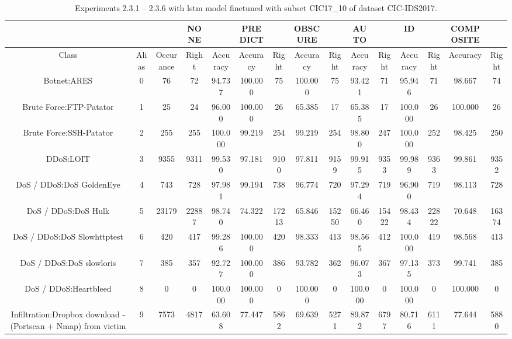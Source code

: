 \begin{table}[htb]
    \centering
    \caption{Experiments 2.3.1 – 2.3.6 with \gls{lstm} model finetuned with subset CIC17_10 of dataset CIC-IDS2017.}
    \label{table:results:lstm:flows_subset}
    \begin{tabular}{@{}ccccccccccccccc@{}}
        \toprule
         &  &  & NONE &  & PREDICT &  & OBSCURE &  & AUTO &  & ID &  & COMPOSITE &  \\
        \midrule
        Class &  Alias &  Occurance &  Right &  Accuracy &  Accuracy &  Right &  Accuracy &  Right &  Accuracy &  Right &  Accuracy &  Right &  Accuracy &  Right \\
        Botnet:ARES &  0 &  76 &  72 &  94.737 &  100.000 &  75 &  100.000 &  75 &  93.421 &  71 &  95.946 &  71 &  98.667 &  74 \\
        Brute Force:FTP-Patator &  1 &  25 &  24 &  96.000 &  100.000 &  26 &  65.385 &  17 &  65.385 &  17 &  100.000 &  26 &  100.000 &  26 \\
        Brute Force:SSH-Patator &  2 &  255 &  255 &  100.000 &  99.219 &  254 &  99.219 &  254 &  98.800 &  247 &  100.000 &  252 &  98.425 &  250 \\
        DDoS:LOIT &  3 &  9355 &  9311 &  99.530 &  97.181 &  9100 &  97.811 &  9159 &  99.915 &  9353 &  99.989 &  9363 &  99.861 &  9352 \\
        DoS / DDoS:DoS GoldenEye &  4 &  743 &  728 &  97.981 &  99.194 &  738 &  96.774 &  720 &  97.294 &  719 &  96.900 &  719 &  98.113 &  728 \\
        DoS / DDoS:DoS Hulk &  5 &  23179 &  22887 &  98.740 &  74.322 &  17213 &  65.846 &  15250 &  66.460 &  15422 &  98.434 &  22822 &  70.648 &  16374 \\
        DoS / DDoS:DoS Slowhttptest &  6 &  420 &  417 &  99.286 &  100.000 &  420 &  98.333 &  413 &  98.565 &  412 &  100.000 &  419 &  98.568 &  413 \\
        DoS / DDoS:DoS slowloris &  7 &  385 &  357 &  92.727 &  100.000 &  386 &  93.782 &  362 &  96.073 &  367 &  97.135 &  373 &  99.741 &  385 \\
        DoS / DDoS:Heartbleed &  8 &  0 &  0 &  100.000 &  100.000 &  0 &  100.000 &  0 &  100.000 &  0 &  100.000 &  0 &  100.000 &  0 \\
        Infiltration:Dropbox download - (Portscan + Nmap) from victim &  9 &  7573 &  4817 &  63.608 &  77.447 &  5862 &  69.639 &  5271 &  89.872 &  6797 &  80.716 &  6111 &  77.644 &  5880 \\

\end{tabular}
\end{table}
